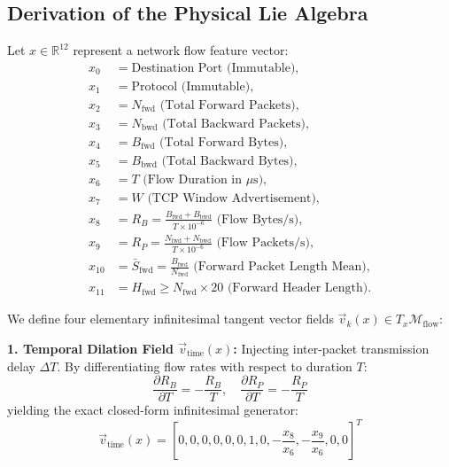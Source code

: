 \documentclass[10pt,journal,compsoc]{IEEEtran}
\begin{document}
\subsection{Derivation of the Physical Lie Algebra}
Let $x \in \mathbb{R}^{12}$ represent a network flow feature vector:
\begin{align*}
    x_0 &= \text{Destination Port (Immutable)}, \\
    x_1 &= \text{Protocol (Immutable)}, \\
    x_2 &= N_{\text{fwd}} \text{ (Total Forward Packets)}, \\
    x_3 &= N_{\text{bwd}} \text{ (Total Backward Packets)}, \\
    x_4 &= B_{\text{fwd}} \text{ (Total Forward Bytes)}, \\
    x_5 &= B_{\text{bwd}} \text{ (Total Backward Bytes)}, \\
    x_6 &= T \text{ (Flow Duration in }\mu\text{s)}, \\
    x_7 &= W \text{ (TCP Window Advertisement)}, \\
    x_8 &= R_B = \frac{B_{\text{fwd}} + B_{\text{bwd}}}{T \times 10^{-6}} \text{ (Flow Bytes/s)}, \\
    x_9 &= R_P = \frac{N_{\text{fwd}} + N_{\text{bwd}}}{T \times 10^{-6}} \text{ (Flow Packets/s)}, \\
    x_{10} &= \bar{S}_{\text{fwd}} = \frac{B_{\text{fwd}}}{N_{\text{fwd}}} \text{ (Forward Packet Length Mean)}, \\
    x_{11} &= H_{\text{fwd}} \ge N_{\text{fwd}} \times 20 \text{ (Forward Header Length)}.
\end{align*}

We define four elementary infinitesimal tangent vector fields $\vec{v}_k(x) \in T_x \mathcal{M}_{\text{flow}}$:

\textbf{1. Temporal Dilation Field $\vec{v}_{\text{time}}(x)$:}
Injecting inter-packet transmission delay $\Delta T$. By differentiating flow rates with respect to duration $T$:
\begin{equation}
    \frac{\partial R_B}{\partial T} = -\frac{R_B}{T}, \quad \frac{\partial R_P}{\partial T} = -\frac{R_P}{T}
\end{equation}
yielding the exact closed-form infinitesimal generator:
\begin{equation}
    \vec{v}_{\text{time}}(x) = \left[ 0, 0, 0, 0, 0, 0, 1, 0, -\frac{x_8}{x_6}, -\frac{x_9}{x_6}, 0, 0 \right]^T
\end{equation}
\end{document}
